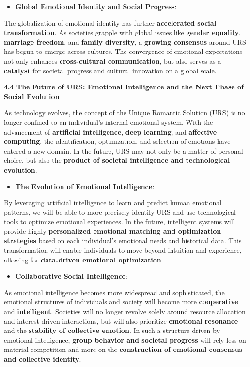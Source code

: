 \documentclass[a4paper]{article}
\begin{document}
\begin{itemize}[resume*=listWWNumxi]
\item \textbf{Global Emotional Identity and Social Progress}:
\end{itemize}
The globalization of emotional identity has further \textbf{accelerated social transformation}. As societies grapple
with global issues like \textbf{gender equality}, \textbf{marriage freedom}, and \textbf{family diversity}, a
\textbf{growing consensus} around URS has begun to emerge across cultures. The convergence of emotional expectations
not only enhances \textbf{cross-cultural communication}, but also serves as a \textbf{catalyst} for societal progress
and cultural innovation on a global scale.

\textbf{4.4 The Future of URS: Emotional Intelligence and the Next Phase of Social Evolution}

As technology evolves, the concept of the Unique Romantic Solution (URS) is no longer confined to an individual's
internal emotional system. With the advancement of \textbf{artificial intelligence}, \textbf{deep learning}, and
\textbf{affective computing}, the identification, optimization, and selection of emotions have entered a new domain. In
the future, URS may not only be a matter of personal choice, but also the \textbf{product of societal intelligence and
technological evolution}.

\begin{itemize}[series=listWWNumxii,label=[F0B7?]]
\item \textbf{The Evolution of Emotional Intelligence}:
\end{itemize}
By leveraging artificial intelligence to learn and predict human emotional patterns, we will be able to more precisely
identify URS and use technological tools to optimize emotional experiences. In the future, intelligent systems will
provide highly \textbf{personalized emotional matching and optimization strategies} based on each individual's
emotional needs and historical data. This transformation will enable individuals to move beyond intuition and
experience, allowing for \textbf{data-driven emotional optimization}.

\begin{itemize}[resume*=listWWNumxii]
\item \textbf{Collaborative Social Intelligence}:
\end{itemize}
As emotional intelligence becomes more widespread and sophisticated, the emotional structures of individuals and society
will become more \textbf{cooperative} and \textbf{intelligent}. Societies will no longer revolve solely around resource
allocation and interest-driven interactions, but will also prioritize \textbf{emotional resonance} and the
\textbf{stability of collective emotion}. In such a structure driven by emotional intelligence, \textbf{group behavior
and societal progress} will rely less on material competition and more on the \textbf{construction of emotional
consensus and collective identity}.
\end{document}
